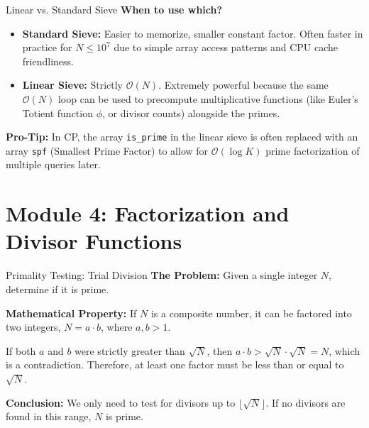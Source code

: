 \documentclass[aspectratio=169]{beamer}
\begin{document}
\begin{frame}{Linear vs. Standard Sieve}
    \textbf{When to use which?}
    
    \begin{itemize}
        \item \textbf{Standard Sieve:} Easier to memorize, smaller constant factor. Often faster in practice for $N \le 10^7$ due to simple array access patterns and CPU cache friendliness.
        \item \textbf{Linear Sieve:} Strictly $\mathcal{O}(N)$. Extremely powerful because the same $\mathcal{O}(N)$ loop can be used to precompute multiplicative functions (like Euler's Totient function $\phi$, or divisor counts) alongside the primes.
    \end{itemize}
    
    \vspace{0.3cm}
    \textbf{Pro-Tip:} In CP, the array \texttt{is\_prime} in the linear sieve is often replaced with an array \texttt{spf} (Smallest Prime Factor) to allow for $\mathcal{O}(\log K)$ prime factorization of multiple queries later.
\end{frame}


\section{Module 4: Factorization and Divisor Functions}

\begin{frame}{Primality Testing: Trial Division}
    \textbf{The Problem:} Given a single integer $N$, determine if it is prime.
    
    \vspace{0.3cm}
    \textbf{Mathematical Property:} 
    If $N$ is a composite number, it can be factored into two integers, $N = a \cdot b$, where $a, b > 1$. 
    
    If both $a$ and $b$ were strictly greater than $\sqrt{N}$, then $a \cdot b > \sqrt{N} \cdot \sqrt{N} = N$, which is a contradiction. Therefore, at least one factor must be less than or equal to $\sqrt{N}$.
    
    \vspace{0.3cm}
    \textbf{Conclusion:} 
    We only need to test for divisors up to $\lfloor\sqrt{N}\rfloor$. If no divisors are found in this range, $N$ is prime.
\end{frame}
\end{document}
